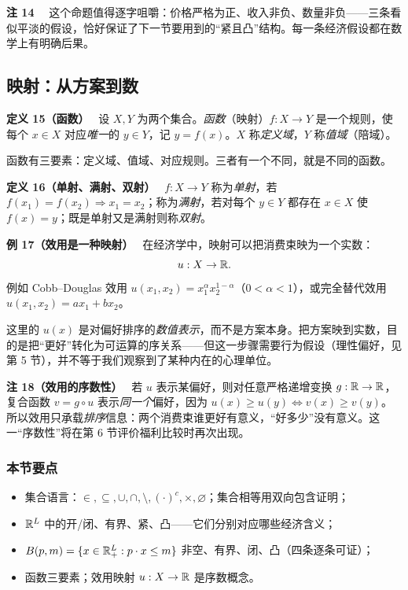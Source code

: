 \textbf{注 14}　
这个命题值得逐字咀嚼：价格严格为正、收入非负、数量非负——三条看似平淡的假设，恰好保证了下一节要用到的“紧且凸”结构。每一条经济假设都在数学上有明确后果。




\subsection{映射：从方案到数}



\textbf{定义 15}\textbf{（函数）}　
设 $X,Y$ 为两个集合。\emph{函数}（映射）$f:X\to Y$ 是一个规则，使每个 $x\in X$ 对应\emph{唯一}的 $y\in Y$，记 $y=f(x)$。$X$ 称\emph{定义域}，$Y$ 称\emph{值域}（陪域）。




函数有三要素：定义域、值域、对应规则。三者有一个不同，就是不同的函数。



\textbf{定义 16}\textbf{（单射、满射、双射）}　
$f:X\to Y$ 称为\emph{单射}，若 $f(x_1)=f(x_2)\Rightarrow x_1=x_2$；称为\emph{满射}，若对每个 $y\in Y$ 都存在 $x\in X$ 使 $f(x)=y$；既是单射又是满射则称\emph{双射}。






\textbf{例 17}\textbf{（效用是一种映射）}　
在经济学中，映射可以把消费束映为一个实数：
\[
u:X\to\mathbb{R} .
\]
例如 Cobb–Douglas 效用 $u(x_1,x_2)=x_1^{\alpha}x_2^{1-\alpha}$（$0<\alpha<1$），或完全替代效用 $u(x_1,x_2)=a x_1+b x_2$。




这里的 $u(x)$ 是对偏好排序的\emph{数值表示}，而不是方案本身。把方案映到实数，目的是把“更好”转化为可运算的序关系——但这一步骤需要行为假设（理性偏好，见第 5 节），并不等于我们观察到了某种内在的心理单位。



\textbf{注 18}\textbf{（效用的序数性）}　
若 $u$ 表示某偏好，则对任意严格递增变换 $g:\mathbb{R}\to\mathbb{R}$，复合函数 $v=g\circ u$ 表示\emph{同一个}偏好，因为 $u(x)\ge u(y)\iff v(x)\ge v(y)$。所以效用只承载\emph{排序}信息：两个消费束谁更好有意义，“好多少”没有意义。这一“序数性”将在第 6 节评价福利比较时再次出现。






\subsubsection*{本节要点}


\begin{itemize}
  \item 集合语言：$\in,\subseteq,\cup,\cap,\setminus,(\cdot)^{c},\times,\varnothing$；集合相等用双向包含证明；
  \item $\mathbb{R}^{L}$ 中的开/闭、有界、紧、凸——它们分别对应哪些经济含义；
  \item $B(p,m)=\{x\in\mathbb{R}_+^{L}:p\cdot x\le m\}$ 非空、有界、闭、凸（四条逐条可证）；
  \item 函数三要素；效用映射 $u:X\to\mathbb{R}$ 是序数概念。
\end{itemize}

